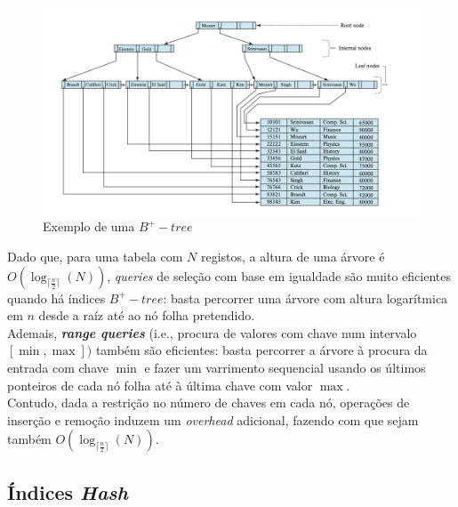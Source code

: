 \documentclass[oneside]{book}
\theoremstyle{definition}
\begin{document}
\begin{figure}[H]
    \centering
    \includegraphics[scale = 1]{cap_indices/btree.png}
    \caption{Exemplo de uma $B^{+}-tree$}
\end{figure}

Dado que, para uma tabela com $N$ registos, a altura de uma árvore é $O(\log_{\lceil\frac{n}{2}\rceil}(N))$, \textit{queries} de seleção com base em igualdade são muito eficientes quando há índices $B^{+}-tree$: basta percorrer uma árvore com altura logarítmica em $n$ desde a raíz até ao nó folha pretendido. \\
Ademais, \textbf{\textit{range queries}} (i.e., procura de valores com chave num intervalo $[\min, \max])$ também são eficientes: basta percorrer a árvore à procura da entrada com chave $\min$ e fazer um varrimento sequencial usando os últimos ponteiros de cada nó folha até à última chave com valor $\max$. \\
Contudo, dada a restrição no número de chaves em cada nó, operações de inserção e remoção induzem um \textit{overhead} adicional, fazendo com que sejam também $O(\log_{\lceil\frac{n}{2}\rceil}(N))$.


\subsection{Índices \textit{Hash}}
\end{document}
